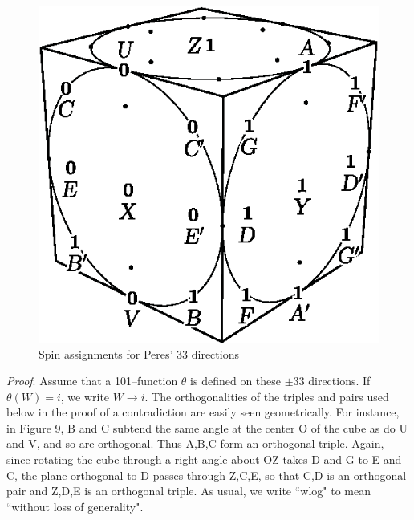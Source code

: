 \documentclass[12pt]{amsart}
\begin{document}
\begin{figure}[!h]

\includegraphics{NewCube2.eps}
\caption{Spin assignments for Peres' $33$ directions}
\end{figure}


{\it Proof}.  Assume that a 101--function $\theta$ is defined on these 
$\pm 33$ directions. If $\theta(W) = i$, we write $W \to i$. 
The orthogonalities of the triples and pairs used below in the proof 
of a contradiction are easily seen geometrically.
For instance, in Figure 9, B  and C subtend the same angle at the center O of 
the cube as do  U  and  V, and so are orthogonal.  Thus A,B,C form an 
orthogonal triple.  Again, since rotating the cube through a right angle about 
OZ takes D and G to E and C, the plane orthogonal to  D  passes through 
Z,C,E, so that  C,D is an orthogonal pair and  Z,D,E  is an orthogonal triple.  
As usual, we write ``wlog" to mean ``without loss of generality".
\end{document}
